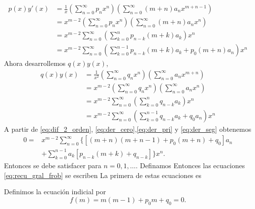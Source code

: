 \begin{equation}\label{eq:der_pri}
  \begin{split}
    p(x)y'(x)&=\frac{1}{x}\left(\sum_{n=0}^{\infty}p_nx^n\right)\left(\sum_{n=0}^{\infty}(m+n)a_{n}x^{m+n-1}\right)\\
&=x^{m-2}\left(\sum_{n=0}^{\infty}p_nx^n\right)\left(\sum_{n=0}^{\infty}(m+n)a_{n}x^{n}\right)\\
&= x^{m-2}\sum_{n=0}^{\infty}\left(\sum_{k=0}^np_{n-k}(m+k)a_k\right)x^n\\
&= x^{m-2}\sum_{n=0}^{\infty}\left(\sum_{k=0}^{n-1}p_{n-k}(m+k)a_k+p_0(m+n)a_n\right)x^n
  \end{split}
\end{equation}
Ahora desarrollemos $q(x)y(x)$,
\begin{equation}\label{eq:der_cero}
  \begin{split}
    q(x)y(x)&=\frac{1}{x^2}\left(\sum_{n=0}^{\infty}q_nx^n\right)\left(\sum_{n=0}^{\infty}a_{n}x^{m+n}\right)\\
&=x^{m-2}\left(\sum_{n=0}^{\infty}q_nx^n\right)\left(\sum_{n=0}^{\infty}a_{n}x^{n}\right)\\
&= x^{m-2}\sum_{n=0}^{\infty}\left(\sum_{k=0}^nq_{n-k}a_k\right)x^n\\
&= x^{m-2}\sum_{n=0}^{\infty}\left(\sum_{k=0}^{n-1}q_{n-k}a_k+q_0a_n\right)x^n
  \end{split}
\end{equation}
A partir de \eqref{eq:dif_2_orden}, \eqref{eq:der_cero},\eqref{eq:der_pri} y \eqref{eq:der_seg} obtenemos
\begin{equation}
\begin{split}
  0=&x^{m-2}\sum_{n=0}^{\infty}\bigg\{\left[(m+n)(m+n-1)+p_0(m+n)  +q_0  \right] a_{n}\\&+\sum_{k=0}^{n-1}a_k\left[p_{n-k}(m+k) +
q_{n-k}\right]\bigg\}x^n.
\end{split}
\end{equation}
Entonces se debe satisfacer
para $n=0,1,\ldots$. Definamos
Entonces las ecuaciones \eqref{eq:recu_gral_frob} se escriben
La primera de estas ecuaciones es
\begin{definicion}{} Definimos la  ecuación indicial por
\begin{equation}\label{eq:eq_indicial}
  f(m)=m(m-1)+p_0m+q_0=0.
\end{equation}

\end{definicion}

